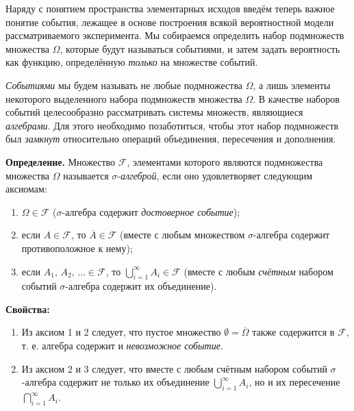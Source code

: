 \documentclass[11pt,a4paper]{article}
\providecommand{\tightlist}{%
      \setlength{\itemsep}{0pt}\setlength{\parskip}{0pt}}
\begin{document}
Наряду с понятием пространства элементарных исходов введём теперь важное
понятие события, лежащее в основе построения всякой вероятностной модели
рассматриваемого эксперимента.
Мы собираемся определить набор подмножеств множества \(\Omega\), которые
будут называться событиями, и затем задать вероятность как функцию,
определённую \emph{только} на множестве событий.

\emph{Событиями} мы будем называть не любые подмножества \(\Omega\), а
лишь элементы некоторого выделенного набора подмножеств множества
\(\Omega\). В качестве наборов событий целесообразно рассматривать
системы множеств, являющиеся \emph{алгебрами}. Для этого необходимо
позаботиться, чтобы этот набор подмножеств был \emph{замкнут}
относительно операций объединения, пересечения и дополнения.

\textbf{Определение.} Множество \(\mathcal{F}\), элементами которого
являются подмножества множества \(\Omega\) называется
\(\sigma\)-\emph{алгеброй}, если оно удовлетворяет следующим аксиомам:

\begin{enumerate}
\def\labelenumi{\arabic{enumi}.}
\tightlist
\item
  \(\Omega \in \mathcal{F}\) (\(\sigma\)-алгебра содержит
  \emph{достоверное событие});
\item
  если \(A \in \mathcal{F}\), то \(\overline{A} \in \mathcal{F}\)
  (вместе с любым множеством \(\sigma\)-алгебра содержит противоположное
  к нему);
\item
  если \(A_1,\,A_2,\,\ldots \in \mathcal{F}\), то
  \(\bigcup\limits_{i=1}^{\infty}A_i \in \mathcal{F}\) (вместе с любым
  \emph{счётным} набором событий \(\sigma\)-алгебра содержит их
  объединение).
\end{enumerate}

    \textbf{Свойства:}

\begin{enumerate}
\def\labelenumi{\arabic{enumi}.}
\tightlist
\item
  Из аксиом 1 и 2 следует, что пустое множество
  \(\emptyset = \overline{\Omega}\) также содержится в \(\mathcal{F}\),
  т. е. алгебра содержит и \emph{невозможное событие}.
\item
  Из аксиом 2 и 3 следует, что вместе с любым счётным набором событий
  \(\sigma\)-алгебра содержит не только их объединение
  \(\bigcup\limits_{i=1}^{\infty}A_i\), но и их пересечение
  \(\bigcap\limits_{i=1}^{\infty}A_i\).
\end{enumerate}
\end{document}
